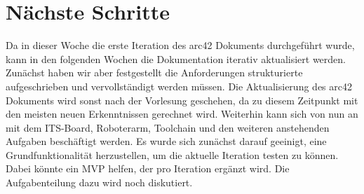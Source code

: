 \documentclass{article}
\begin{document}
\section{Nächste Schritte}
Da in dieser Woche die erste Iteration des arc42 Dokuments durchgeführt wurde, kann in den folgenden Wochen die Dokumentation iterativ aktualisiert werden. Zunächst haben wir aber festgestellt die Anforderungen strukturierte aufgeschrieben und vervollständigt werden müssen. Die Aktualisierung des arc42 Dokuments wird sonst nach der Vorlesung geschehen, da zu diesem Zeitpunkt mit den meisten neuen Erkenntnissen gerechnet wird. Weiterhin kann sich von nun an mit dem ITS-Board, Roboterarm, Toolchain und den weiteren anstehenden Aufgaben beschäftigt werden. Es wurde sich zunächst darauf geeinigt, eine Grundfunktionalität herzustellen, um die aktuelle Iteration testen zu können. Dabei könnte ein MVP helfen, der pro Iteration ergänzt wird. Die Aufgabenteilung dazu wird noch diskutiert.
\end{document}
